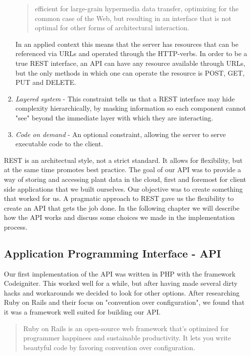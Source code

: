 \begin{enumerate}
\begin{quote} efficient for large-grain hypermedia data transfer, optimizing for the common case of the Web, but resulting in an interface that is not optimal for other forms of architectural interaction. \citep{fielding2000architectural} 
\end{quote}

In an applied context this means that the server has resources that can be referenced via URLs and operated through the HTTP-verbs. In order to be a true REST interface, an API can have any resource available through URLs, but the only methods in which one can operate the resource is POST, GET, PUT and DELETE.

\item{} \emph{Layered system} - This constraint tells us that a REST interface may hide complexity hierarchically, by masking information so each component cannot "see" beyond the immediate layer with which they are interacting. \citep{fielding2000architectural}

\item{} \emph{Code on demand} - An optional constraint, allowing the server to serve executable code to the client. 

\end{enumerate}

REST is an architectual style, not a strict standard. It allows for flexibility, but at the same time promotes best practice. The goal of our API was to provide a way of storing and accessing plant data in the cloud, first and foremost for client side applications that we built ourselves. Our objective was to create something that worked for us. A pragmatic approach to REST gave us the flexibility to create an API that gets the job done. In the following chapter we will describe how the API works and discuss some choices we made in the implementation process.

\subsection{Application Programming Interface - API}
Our first implementation of the API was written in PHP with the framework Codeigniter. This worked well for a while, but after having made several dirty hacks and workarounds we decided to look for other options. After researching Ruby on Rails and their focus on "convention over configuration", we found that it was a framework well suited for building our API.  

\begin{quote}
Ruby on Rails is an open-source web framework that’s optimized for programmer happinees and sustainable productivity. It lets you write beautyful code by favoring convention over configuration. \citep{rubyonrails.org} 
\end{quote}

